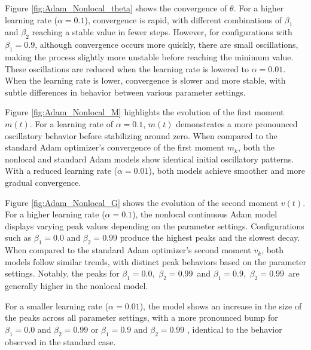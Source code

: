 \documentclass{article} %
\begin{document}
Figure \ref{fig:Adam_Nonlocal_theta} shows the convergence of \(\theta\). For a higher learning rate (\(\alpha = 0.1\)), convergence is rapid, with different combinations of \(\beta_1\) and \(\beta_2\) reaching a stable value in fewer steps. However, for configurations with \(\beta_1 = 0.9\), although convergence occurs more quickly, there are small oscillations, making the process slightly more unstable before reaching the minimum value. These oscillations are reduced when the learning rate is lowered to \(\alpha = 0.01\). When the learning rate is lower, convergence is slower and more stable, with subtle differences in behavior between various parameter settings. 

Figure \ref{fig:Adam_Nonlocal_M} highlights the evolution of the first moment \(m(t)\). For a learning rate of \(\alpha = 0.1\), \(m(t)\) demonstrates a more pronounced oscillatory behavior before stabilizing around zero. When compared to the standard Adam optimizer's convergence of the first moment \(m_k\), both the nonlocal and standard Adam models show identical initial oscillatory patterns. With a reduced learning rate (\(\alpha = 0.01\)), both models achieve smoother and more gradual convergence.

Figure \ref{fig:Adam_Nonlocal_G} shows the evolution of the second moment \(v(t)\). For a higher learning rate (\(\alpha = 0.1\)), the nonlocal continuous Adam model displays varying peak values depending on the parameter settings. Configurations such as \(\beta_1 = 0.0\) and \(\beta_2 = 0.99\) produce the highest peaks and the slowest decay. When compared to the standard Adam optimizer's second moment \(v_k\), both models follow similar trends, with distinct peak behaviors based on the parameter settings. Notably, the peaks for \(\beta_1 = 0.0,\,\,\beta_2 = 0.99\,\) and \(\beta_1 = 0.9,\,\,\beta_2 = 0.99\,\) are generally higher in the nonlocal model.

For a smaller learning rate (\(\alpha = 0.01\)), the model shows an increase in the size of the peaks across all parameter settings, with a more pronounced bump for \(\beta_1 = 0.0\) and \(\beta_2 = 0.99\) or \(\beta_1 = 0.9\) and \(\beta_2 = 0.99\) , identical to the behavior observed in the standard case.
\end{document}
